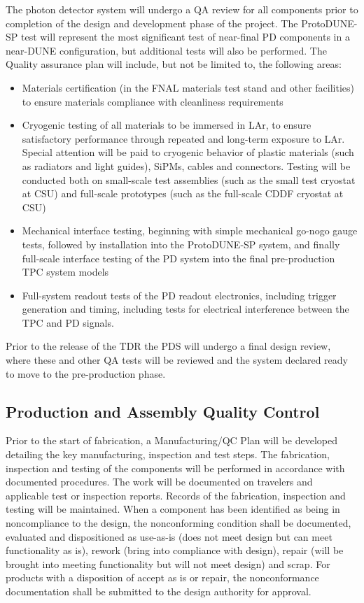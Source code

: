 The photon detector system will undergo a QA review for all components prior to completion of the design and development phase of the project.  The ProtoDUNE-SP test will represent the most significant test of near-final PD components in a near-DUNE configuration, but additional tests will also be performed.  The Quality assurance plan will include, but not be limited to, the following areas:

\begin{itemize}
\item Materials certification (in the FNAL materials test stand and other facilities) to ensure materials compliance with cleanliness requirements
\item Cryogenic testing of all materials to be immersed in LAr, to ensure satisfactory performance through repeated and long-term exposure to LAr.  Special attention will be paid to cryogenic behavior of plastic materials (such as radiators and light guides), SiPMs, cables and connectors.  Testing will be conducted both on small-scale test assemblies (such as the small test cryostat at CSU) and full-scale prototypes (such as the full-scale CDDF cryostat at CSU) 
\item Mechanical interface testing, beginning with simple mechanical go-nogo gauge tests, followed by installation into the ProtoDUNE-SP system, and finally full-scale interface testing of the PD system into the final pre-production TPC system models
\item Full-system readout tests of the PD readout electronics, including trigger generation and timing, including tests for electrical interference between the TPC and PD signals.
\end{itemize}

Prior to the release of the TDR the PDS will undergo a final design review, where these and other QA tests will be reviewed and the system declared ready to move to the pre-production phase.


\subsection{Production and Assembly Quality Control}
\label{sec:fdsp-pd-prodqc}

Prior to the start of fabrication, a Manufacturing/QC Plan will be developed detailing the key manufacturing, inspection and test steps.  The fabrication, inspection and testing of the components will be performed in accordance with documented procedures. The work will be documented on travelers and applicable test or inspection reports. Records of the fabrication, inspection and testing will be maintained. When a component has been identified as being in noncompliance to the design, the nonconforming condition shall be documented, evaluated and dispositioned as use-as-is (does not meet design but can meet functionality as is), rework (bring into compliance with design), repair (will be brought into meeting functionality but will not meet design) and scrap. For products with a disposition of accept as is or repair, the nonconformance documentation shall be submitted to the design authority for approval.   

